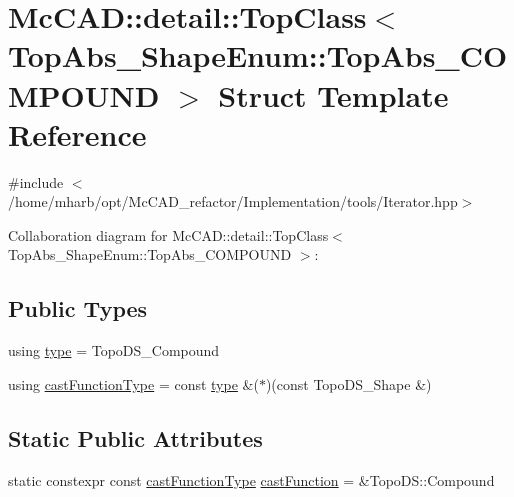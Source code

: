 \hypertarget{structMcCAD_1_1detail_1_1TopClass_3_01TopAbs__ShapeEnum_1_1TopAbs__COMPOUND_01_4}{}\section{Mc\+C\+AD\+:\+:detail\+:\+:Top\+Class$<$ Top\+Abs\+\_\+\+Shape\+Enum\+:\+:Top\+Abs\+\_\+\+C\+O\+M\+P\+O\+U\+ND $>$ Struct Template Reference}
\label{structMcCAD_1_1detail_1_1TopClass_3_01TopAbs__ShapeEnum_1_1TopAbs__COMPOUND_01_4}


{\ttfamily \#include $<$/home/mharb/opt/\+Mc\+C\+A\+D\+\_\+refactor/\+Implementation/tools/\+Iterator.\+hpp$>$}



Collaboration diagram for Mc\+C\+AD\+:\+:detail\+:\+:Top\+Class$<$ Top\+Abs\+\_\+\+Shape\+Enum\+:\+:Top\+Abs\+\_\+\+C\+O\+M\+P\+O\+U\+ND $>$\+:
\subsection*{Public Types}
\begin{DoxyCompactItemize}
\item 
using \hyperlink{structMcCAD_1_1detail_1_1TopClass_3_01TopAbs__ShapeEnum_1_1TopAbs__COMPOUND_01_4_ae793310e8de55b4dfa6feb6fe88166e3}{type} = Topo\+D\+S\+\_\+\+Compound
\item 
using \hyperlink{structMcCAD_1_1detail_1_1TopClass_3_01TopAbs__ShapeEnum_1_1TopAbs__COMPOUND_01_4_ac0820b58a85f0c76bc9de24042a90de0}{cast\+Function\+Type} = const \hyperlink{structMcCAD_1_1detail_1_1TopClass_3_01TopAbs__ShapeEnum_1_1TopAbs__COMPOUND_01_4_ae793310e8de55b4dfa6feb6fe88166e3}{type} \&($\ast$)(const Topo\+D\+S\+\_\+\+Shape \&)
\end{DoxyCompactItemize}
\subsection*{Static Public Attributes}
\begin{DoxyCompactItemize}
\item 
static constexpr const \hyperlink{structMcCAD_1_1detail_1_1TopClass_3_01TopAbs__ShapeEnum_1_1TopAbs__COMPOUND_01_4_ac0820b58a85f0c76bc9de24042a90de0}{cast\+Function\+Type} \hyperlink{structMcCAD_1_1detail_1_1TopClass_3_01TopAbs__ShapeEnum_1_1TopAbs__COMPOUND_01_4_ab9c536b2729643d14026b55a75f43ba0}{cast\+Function} = \&Topo\+D\+S\+::\+Compound
\end{DoxyCompactItemize}


